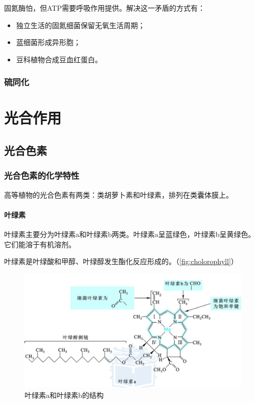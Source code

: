 固氮酶怕，但ATP需要呼吸作用提供。解决这一矛盾的方式有：

\begin{itemize}
	\item 独立生活的固氮细菌保留无氧生活周期；
	\item 蓝细菌形成异形胞；
	\item 豆科植物合成豆血红蛋白。
\end{itemize}


\subsubsection{硫同化}



\section{光合作用}

\subsection{光合色素}

\subsubsection{光合色素的化学特性}

高等植物的光合色素有两类：类胡萝卜素和叶绿素，排列在类囊体膜上。

\paragraph{叶绿素}

叶绿素主要分为叶绿素a和叶绿素b两类。叶绿素a呈蓝绿色，叶绿素b呈黄绿色。它们能溶于有机溶剂。



叶绿素是叶绿酸和甲醇、叶绿醇发生酯化反应形成的。（\autoref{fig:cholorophyll}）

\begin{figure}[htbp]
	\centering
	\includegraphics[width=0.9\linewidth]{Pics/叶绿素a和叶绿素b}
	\caption{叶绿素a和叶绿素b的结构}
	\label{fig:cholorophyll}
\end{figure}


